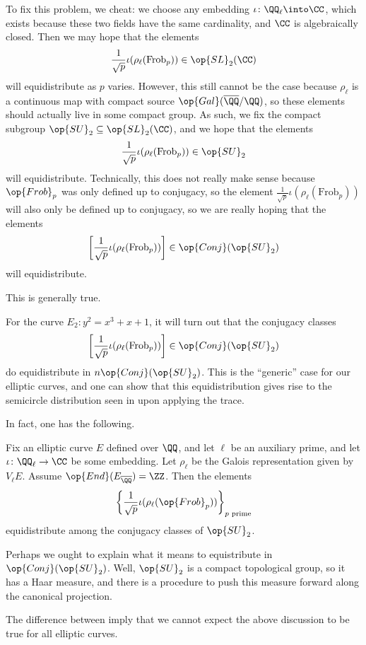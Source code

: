 \documentclass{article}
\begin{document}
To fix this problem, we cheat: we choose any embedding $\iota\colon\QQ_\ell\into\CC$, which exists because these two fields have the same cardinality, and $\CC$ is algebraically closed. Then we may hope that the elements
\[\frac1{\sqrt p}\iota(\rho_\ell({\mathrm{Frob}_p}))\in\op{SL}_2(\CC)\]
will equidistribute as $p$ varies. However, this still cannot be the case because $\rho_\ell$ is a continuous map with compact source $\op{Gal}(\overline\QQ/\QQ)$, so these elements should actually live in some compact group. As such, we fix the compact subgroup ${\op{SU}_2}\subseteq\op{SL}_2(\CC)$, and we hope that the elements
\[\frac1{\sqrt p}\iota(\rho_\ell({\mathrm{Frob}_p}))\in{\op{SU}_2}\]
will equidistribute. Technically, this does not really make sense because $\op{Frob}_p$ was only defined up to conjugacy, so the element $\frac1{\sqrt p}\iota(\rho_\ell({\mathrm{Frob}_p}))$ will also only be defined up to conjugacy, so we are really hoping that the elements
\[\left[\frac1{\sqrt p}\iota(\rho_\ell({\mathrm{Frob}_p}))\right]\in\op{Conj}({\op{SU}_2})\]
will equidistribute.

This is generally true.
\begin{example}
	For the curve $E_2\colon y^2=x^3+x+1$, it will turn out that the conjugacy classes
	\[\left[\frac1{\sqrt p}\iota(\rho_\ell({\mathrm{Frob}_p}))\right]\in\op{Conj}({\op{SU}_2})\]
	do equidistribute in $n\op{Conj}({\op{SU}_2})$. This is the ``generic'' case for our elliptic curves, and one can show that this equidistribution gives rise to the semicircle distribution seen in  upon applying the trace.
\end{example}
In fact, one has the following.
\begin{theorem}
	Fix an elliptic curve $E$ defined over $\QQ$, and let $\ell$ be an auxiliary prime, and let $\iota\colon\QQ_\ell\to\CC$ be some embedding. Let $\rho_\ell$ be the Galois representation given by $V_\ell E$. Assume $\op{End}(E_{\overline\QQ})=\ZZ$. Then the elements
	\[\left\{\frac1{\sqrt p}\iota(\rho_\ell({\op{Frob}_p}))\right\}_{p\text{ prime}}\]
	equidistribute among the conjugacy classes of $\op{SU}_2$.
\end{theorem}
\begin{remark}
	Perhaps we ought to explain what it means to equistribute in $\op{Conj}({\op{SU}_2})$. Well, $\op{SU}_2$ is a compact topological group, so it has a Haar measure, and there is a procedure to push this measure forward along the canonical projection.
\end{remark}
The difference between  imply that we cannot expect the above discussion to be true for all elliptic curves.
\end{document}
